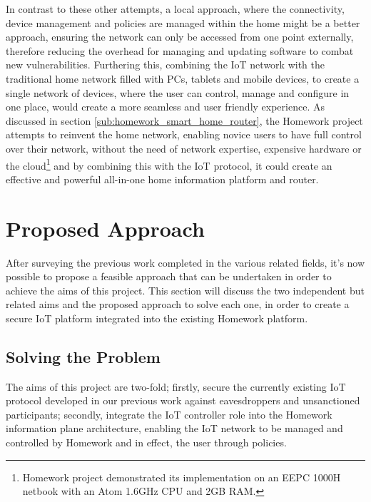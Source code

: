 \documentclass{mprop}
\begin{document}
In contrast to these other attempts, a local approach, where the connectivity, device management and policies are managed within the home might be a better approach, ensuring the network can only be accessed from one point externally, therefore reducing the overhead for managing and updating software to combat new vulnerabilities. Furthering this, combining the IoT network with the traditional home network filled with PCs, tablets and mobile devices, to create a single network of devices, where the user can control, manage and configure in one place, would create a more seamless and user friendly experience. As discussed in section \ref{sub:homework_smart_home_router}, the Homework project attempts to reinvent the home network, enabling novice users to have full control over their network, without the need of network expertise, expensive hardware or the cloud\footnote{Homework project demonstrated its implementation on an EEPC 1000H netbook with an Atom 1.6GHz CPU and 2GB RAM.} and by combining this with the IoT protocol, it could create an effective and powerful all-in-one home information platform and router. 

\section{Proposed Approach}

After surveying the previous work completed in the various related fields, it's now possible to propose a feasible approach that can be undertaken in order to achieve the aims of this project. This section will discuss the two independent but related aims and the proposed approach to solve each one, in order to create a secure IoT platform integrated into the existing Homework platform.


\subsection{Solving the Problem} %
\label{sub:solving_the_problem}
The aims of this project are two-fold; firstly, secure the currently existing IoT protocol developed in our previous work against eavesdroppers and unsanctioned participants; secondly, integrate the IoT controller role into the Homework information plane architecture, enabling the IoT network to be managed and controlled by Homework and in effect, the user through policies.
\end{document}
